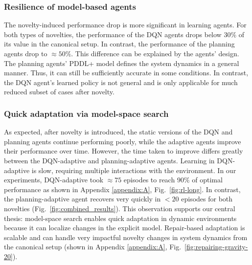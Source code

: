 \documentclass[letterpaper]{article} %
\begin{document}
\subsubsection{Resilience of model-based agents}
The novelty-induced performance drop is more significant in learning agents. For both types of novelties, the performance of the DQN agents drops below $30\%$ of its value in the canonical setup. In contrast, the performance of the planning agents drop to $\approx50\%$. This difference can be explained by the agents' design. The planning agents' PDDL+ model defines the system dynamics in a general manner. Thus, it can still be sufficiently accurate in some conditions. In contrast, the DQN agent's learned policy is not general and is only applicable for much reduced subset of cases after novelty.


\subsubsection{Quick adaptation via model-space search} As expected, after novelty is introduced, the static versions of the DQN and planning agents continue performing poorly, while the adaptive agents improve their performance over time. However, the time taken to improve differs greatly between the DQN-adaptive and planning-adaptive agents.
Learning in DQN-adaptive is slow, requiring multiple interactions with the environment. In our experiments, DQN-adaptive took $\approx75$ episodes to reach $90\%$ of optimal performance as shown in Appendix \ref{appendix:A}, Fig.~\ref{fig:rl-long}. In contrast, the planning-adaptive agent recovers very quickly in $<20$ episodes for both novelties (Fig.~\ref{fig:combined_results}). This observation supports our central thesis: model-space search enables quick adaptation in dynamic environments because it can localize changes in the explicit model. Repair-based adaptation is scalable and can handle very impactful novelty changes in system dynamics from the canonical setup (shown in Appendix \ref{appendix:A}, Fig.~\ref{fig:repairing-gravity-20}).
\end{document}
